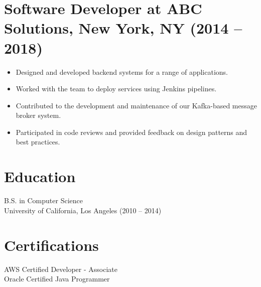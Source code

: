 \documentclass[11pt]{article}
\begin{document}
\section*{Software Developer at ABC Solutions, New York, NY (2014 -- 2018)}
\begin{itemize}[left=0pt]
  \item Designed and developed backend systems for a range of applications.
  \item Worked with the team to deploy services using Jenkins pipelines.
  \item Contributed to the development and maintenance of our Kafka-based message broker system.
  \item Participated in code reviews and provided feedback on design patterns and best practices.
\end{itemize}

\vspace{1em}
\section*{Education}
B.S. in Computer Science \\
University of California, Los Angeles (2010 -- 2014)

\vspace{-0.5em}
\section*{Certifications}
AWS Certified Developer - Associate \\
Oracle Certified Java Programmer
\end{document}
